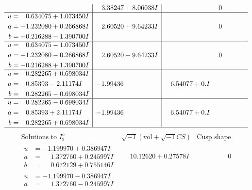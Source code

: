 \documentclass[1p]{elsarticle_modified}
\theoremstyle{definition}
\newcommand{\I}{\sqrt{-1}}
\begin{document}
$$\begin{array}{c|c|c}
 & \phantom{-}3.38247 + 8.06038 I & \phantom{-0.000000 } 0 \\ \hline\begin{aligned}
u &= \phantom{-}0.634075 + 1.073450 I \\
a &= -1.232080 + 0.266868 I \\
b &= -0.216288 - 1.390700 I\end{aligned}
 & \phantom{-}2.60520 + 9.64233 I & \phantom{-0.000000 } 0 \\ \hline\begin{aligned}
u &= \phantom{-}0.634075 - 1.073450 I \\
a &= -1.232080 - 0.266868 I \\
b &= -0.216288 + 1.390700 I\end{aligned}
 & \phantom{-}2.60520 - 9.64233 I & \phantom{-0.000000 } 0 \\ \hline\begin{aligned}
u &= \phantom{-}0.282265 + 0.698034 I \\
a &= \phantom{-}0.85393 - 2.11174 I \\
b &= \phantom{-}0.282265 - 0.698034 I\end{aligned}
 & -1.99436\phantom{ +0.000000I} & \phantom{-}6.54077 + 0. I\phantom{ +0.000000I} \\ \hline\begin{aligned}
u &= \phantom{-}0.282265 - 0.698034 I \\
a &= \phantom{-}0.85393 + 2.11174 I \\
b &= \phantom{-}0.282265 + 0.698034 I\end{aligned}
 & -1.99436\phantom{ +0.000000I} & \phantom{-}6.54077 + 0. I\phantom{ +0.000000I}\\
 \hline 
 \end{array}$$\newpage$$\begin{array}{c|c|c}  
\text{Solutions to }I^u_{2}& \I (\text{vol} + \sqrt{-1}CS) & \text{Cusp shape}\\
 \hline 
\begin{aligned}
u &= -1.199970 + 0.386947 I \\
a &= \phantom{-}1.372760 + 0.245997 I \\
b &= \phantom{-}0.672129 + 0.755146 I\end{aligned}
 & \phantom{-}10.12620 + 0.27578 I & \phantom{-0.000000 } 0 \\ \hline\begin{aligned}
u &= -1.199970 - 0.386947 I \\
a &= \phantom{-}1.372760 - 0.245997 I \\

\end{aligned}
\end{array}$$
\end{document}
